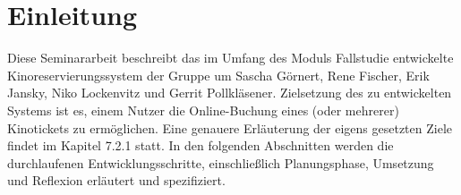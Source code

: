 \chapter{Einleitung}

Diese Seminararbeit beschreibt das im Umfang des Moduls Fallstudie entwickelte Kinoreservierungssystem der Gruppe um Sascha Görnert, Rene Fischer, Erik Jansky, Niko Lockenvitz und Gerrit Pollkläsener. 
Zielsetzung des zu entwickelten Systems ist es, einem Nutzer die Online-Buchung eines (oder mehrerer) Kinotickets zu ermöglichen. Eine genauere Erläuterung der eigens gesetzten Ziele findet im Kapitel 7.2.1 statt.
In den folgenden Abschnitten werden die durchlaufenen Entwicklungsschritte, einschließlich Planungsphase, Umsetzung und Reflexion erläutert und spezifiziert.